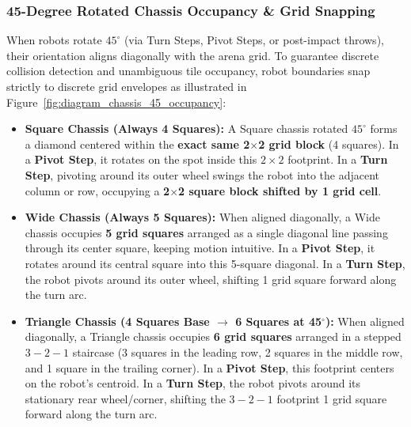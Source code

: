\documentclass[11pt,a4paper]{article}
\begin{document}
\subsubsection{45-Degree Rotated Chassis Occupancy \& Grid Snapping}
When robots rotate $45^\circ$ (via Turn Steps, Pivot Steps, or post-impact throws), their orientation aligns diagonally with the arena grid. To guarantee discrete collision detection and unambiguous tile occupancy, robot boundaries snap strictly to discrete grid envelopes as illustrated in Figure~\ref{fig:diagram_chassis_45_occupancy}:
\begin{itemize}[leftmargin=*, noitemsep, topsep=2pt]
  \item \textbf{Square Chassis (Always 4 Squares):} A Square chassis rotated $45^\circ$ forms a diamond centered within the \textbf{exact same 2$\times$2 grid block} (4 squares). In a \textbf{Pivot Step}, it rotates on the spot inside this $2\times2$ footprint. In a \textbf{Turn Step}, pivoting around its outer wheel swings the robot into the adjacent column or row, occupying a \textbf{2$\times$2 square block shifted by 1 grid cell}.
  \item \textbf{Wide Chassis (Always 5 Squares):} When aligned diagonally, a Wide chassis occupies \textbf{5 grid squares} arranged as a single diagonal line passing through its center square, keeping motion intuitive. In a \textbf{Pivot Step}, it rotates around its central square into this 5-square diagonal. In a \textbf{Turn Step}, the robot pivots around its outer wheel, shifting 1 grid square forward along the turn arc.
  \item \textbf{Triangle Chassis (4 Squares Base $\rightarrow$ 6 Squares at 45$^\circ$):} When aligned diagonally, a Triangle chassis occupies \textbf{6 grid squares} arranged in a stepped $3-2-1$ staircase (3 squares in the leading row, 2 squares in the middle row, and 1 square in the trailing corner). In a \textbf{Pivot Step}, this footprint centers on the robot's centroid. In a \textbf{Turn Step}, the robot pivots around its stationary rear wheel/corner, shifting the $3-2-1$ footprint 1 grid square forward along the turn arc.
\end{itemize}
\end{document}
